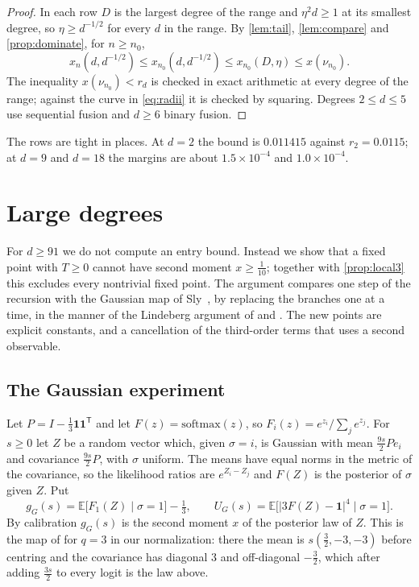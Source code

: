 \documentclass[11pt]{amsart}
\theoremstyle{definition}
\theoremstyle{remark}
\newcommand{\E}{\mathbb{E}}
\newcommand{\one}{\mathbf{1}}
\begin{document}
\begin{proof}
In each row $D$ is the largest degree of the range and $\eta^2d\ge1$ at its smallest degree, so
$\eta\ge d^{-1/2}$ for every $d$ in the range. By \cref{lem:tail}, \cref{lem:compare} and
\cref{prop:dominate}, for $n\ge n_0$,
\[
x_n(d,d^{-1/2})\le x_{n_0}(d,d^{-1/2})\le x_{n_0}(D,\eta)\le x(\nu_{n_0}).
\]
The inequality $x(\nu_{n_0})<r_d$ is checked in exact arithmetic at every degree of the range; against the
curve in \eqref{eq:radii} it is checked by squaring. Degrees $2\le d\le5$ use sequential fusion and $d\ge6$
binary fusion.
\end{proof}

The rows are tight in places. At $d=2$ the bound is $0.011415$ against $r_2=0.0115$; at $d=9$ and $d=18$ the
margins are about $1.5\times10^{-4}$ and $1.0\times10^{-4}$.

\section{Large degrees}\label{sec:large}

For $d\ge91$ we do not compute an entry bound. Instead we show that a fixed point with $T\ge0$ cannot have
second moment $x\ge\tfrac1{10}$; together with \cref{prop:local3} this excludes every nontrivial fixed point. The
argument compares one step of the recursion with the Gaussian map of Sly~\cite[(4.7)]{Sly11}, by replacing the
branches one at a time, in the manner of the Lindeberg argument of \cite[Lemma~4.3]{Sly11} and
\cite[Appendix~A]{MSS22}. The new points are explicit constants, and a cancellation of the third-order terms that
uses a second observable.

\subsection{The Gaussian experiment}
Let $P=I-\tfrac13\one\one^{\mathsf T}$ and let $F(z)=\mathrm{softmax}(z)$, so $F_i(z)=e^{z_i}/\sum_je^{z_j}$. For
$s\ge0$ let $Z$ be a random vector which, given $\sigma=i$, is Gaussian with mean $\tfrac{9s}2Pe_i$ and covariance
$\tfrac{9s}2P$, with $\sigma$ uniform. The means have equal norms in the metric of the covariance, so the
likelihood ratios are $e^{Z_i-Z_j}$ and $F(Z)$ is the posterior of $\sigma$ given $Z$. Put
\[
g_G(s)=\E\big[F_1(Z)\mid\sigma=1\big]-\tfrac13,\qquad U_G(s)=\E\big[|3F(Z)-\one|^4\mid\sigma=1\big].
\]
By calibration $g_G(s)$ is the second moment $x$ of the posterior law of $Z$. This is the map of
\cite[(4.7)]{Sly11} for $q=3$ in our normalization: there the mean is $s(\tfrac32,-3,-3)$ before centring and the
covariance has diagonal $3$ and off-diagonal $-\tfrac32$, which after adding $\tfrac{3s}2$ to every logit is the law
above.
\end{document}
